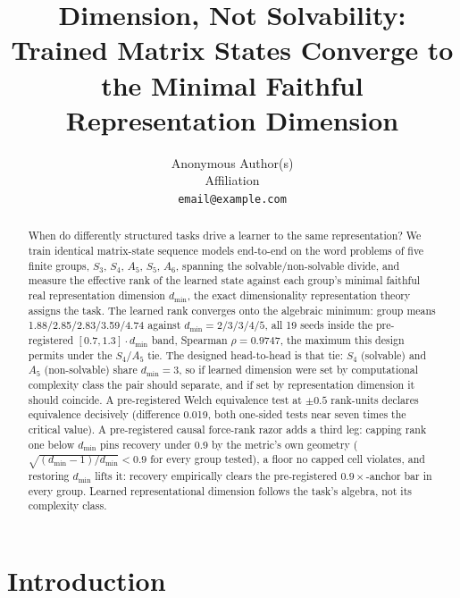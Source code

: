 \documentclass{article}
\title{Dimension, Not Solvability: Trained Matrix States Converge to the
Minimal Faithful Representation Dimension}
\author{%
  Anonymous Author(s)\\
  Affiliation\\
  \texttt{email@example.com}
}
\newcommand{\dmin}{d_{\min}}
\begin{document}
\maketitle

\begin{abstract}
When do differently structured tasks drive a learner to the same
representation? We train identical matrix-state sequence models
end-to-end on the word problems of five finite groups, $S_3$, $S_4$,
$A_5$, $S_5$, $A_6$, spanning the solvable/non-solvable divide, and
measure the effective rank of the learned state against each group's
minimal faithful real representation dimension $\dmin$, the exact
dimensionality representation theory assigns the task. The learned rank
converges onto the algebraic minimum: group means
1.88/2.85/2.83/3.59/4.74 against $\dmin = 2/3/3/4/5$, all 19 seeds
inside the pre-registered $[0.7, 1.3] \cdot \dmin$ band, Spearman
$\rho = 0.9747$, the maximum this design permits under the $S_4$/$A_5$
tie.
The designed head-to-head is that tie: $S_4$ (solvable) and $A_5$
(non-solvable) share $\dmin = 3$, so if learned dimension were set by
computational complexity class the pair should separate, and if set by
representation dimension it should coincide. A pre-registered Welch
equivalence test at $\pm 0.5$ rank-units declares equivalence decisively
(difference 0.019, both one-sided tests near seven times the critical
value).
A pre-registered causal force-rank razor adds a third leg:
capping rank one below $\dmin$ pins recovery under 0.9 by the metric's
own geometry ($\sqrt{(\dmin{-}1)/\dmin} < 0.9$ for every group tested),
a floor no capped cell violates, and restoring $\dmin$ lifts it:
recovery empirically clears the pre-registered $0.9\times$-anchor bar
in every group.
Learned
representational dimension follows the task's algebra, not its
complexity class.
\end{abstract}

\section{Introduction}
\label{sec:intro}
\end{document}
